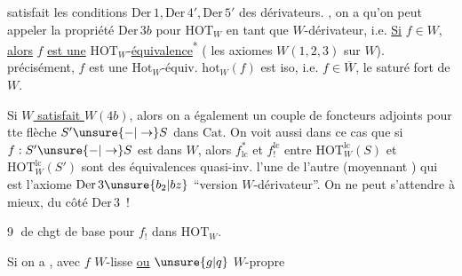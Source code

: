 
satisfait les conditions $\mathrm{Der}\,1,\mathrm{Der}\,4',\mathrm{Der}\,5'$ des dérivateurs.  , on a  qu'on peut appeler la propriété $\mathrm{Der}\,3b$ pour $\mathrm{HOT}_W$ en tant que $W$-dérivateur, i.e. \uline{Si} $f\in W$, \uline{alors} $f$ \uline{est une} $\mathrm{HOT}_W$-\uline{équivalence}\textsuperscript{*}
( les  axiomes $W(1,2,3)$ sur $W$).   précisément, $f$ est une $\mathrm{Hot}_W$-équiv.  $\mathrm{hot}_W(f)$ est iso, i.e. $f\in\overline{W}$, le saturé fort de $W$.

Si \uline{$W$ satisfait $W(4b)$}, alors on a également un couple de foncteurs adjoints
pour tte flèche $S'\unsure{\mathbin{-}|\to}S$ dans $\mathrm{Cat}$.  On voit aussi dans ce cas que
\margin{$\vert$}
si $f:S'\unsure{\mathbin{-}|\to}S$ est dans $W$, alors $f^*_{\mathrm{lc}}$ et $f_!^{\mathrm{lc}}$ entre $\mathrm{HOT}_W^{\mathrm{lc}}(S)$ et $\mathrm{HOT}_W^{\mathrm{lc}}(S')$ sont des équivalences quasi-inv. l'une de l'autre (moyennant )
qui est l'axiome $\mathrm{Der}\,3\unsure{b_2|bz}$ ``version $W$-dérivateur''. On ne peut s'attendre à mieux, du côté $\mathrm{Der}\,3$~!

\textcircled{9}  de chgt de base pour $f_!$ dans $\mathrm{HOT}_W$.

Si on a
, avec $f$ $W$-lisse \uline{ou} $\unsure{g|q}$ $W$-propre
